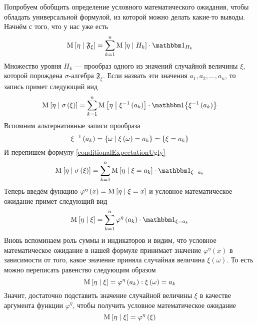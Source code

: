 Попробуем обобщить определение условного математического ожидания,
чтобы обладать универсальной формулой, из которой можно делать какие-то выводы.
Начнём с того, что у нас уже есть
$$\Mean{ \eta \mcond \mathfrak{F}_\xi }
  = \sum_{k=1}^n \Mean{ \eta \mcond H_k } \cdot \indicatorof{H_k}$$
Множество уровня $H_k$ --- прообраз одного из значений случайной величины $\xi$,
которой порождена $\sigma$-алгебра $\mathfrak{F}_\xi$.
Если назвать эти значения $a_1, a_2, \dots, a_n$, то запись примет следующий вид
\begin{equation}\label{conditionalExpectationUgly}
  \Mean{ \eta \mcond \sigma\left( \xi \right) }
      = \sum_{k=1}^n \Mean{\eta \mcond \xi^{-1}\left( a_k \right)}
      \cdot \Indicator{\xi^{-1}\left( a_k \right)}
\end{equation}
Вспомним альтернативные записи прообраза
$$\xi^{-1}\left( a_k \right)
  = \left\{ \omega \;\middle|\; \xi\left( \omega \right) = a_k \right\}
  = \left\{ \xi = a_k \right\}$$
И перепишем формулу \eqref{conditionalExpectationUgly}
$$\Mean{ \eta \mcond \sigma\left( \xi \right) }
  = \sum_{k=1}^n \Mean{\eta \mcond \xi = a_k}
      \cdot \indicatorof{\xi = a_k}$$
Теперь введём функцию
$\varphi^{\eta}\left( x \right) = \operatorname{M}_{} \left[  \eta \;\middle|\; \xi=x  \right]$
и условное математическое ожидание примет следующий вид
$$\Mean{ \eta \mcond \xi }
  = \sum_{k=1}^n \varphi^{\eta}\left( a_k \right)
      \cdot \indicatorof{\xi = a_k}$$
Вновь вспоминаем роль суммы и индикаторов и видим,
что условное математическое ожидание в нашей формуле
принимает значение $\varphi^{\eta}\left( x \right)$ в зависимости от того,
какое значение приняла случайная величина $\xi\left( \omega \right)$.
То есть можно переписать равенство следующим образом
$$\operatorname{M}_{} \left[  \eta \;\middle|\; \xi  \right]
  = \varphi^{\eta}\left( a_k \right): \xi\left( \omega \right) = a_k$$
Значит, достаточно подставить значение случайной величины $\xi$
в качестве аргумента функции $\varphi^{\eta}$,
чтобы получить условное математическое ожидание
$$\operatorname{M}_{} \left[  \eta \;\middle|\; \xi  \right]
  = \varphi^{\eta}\left( \xi \right)$$
